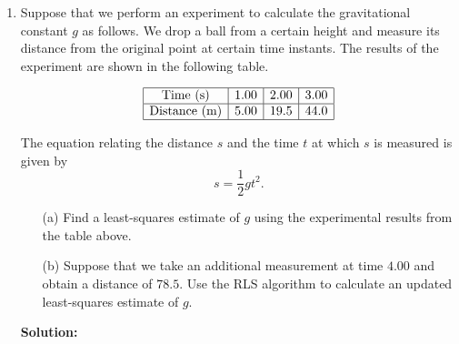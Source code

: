 \documentclass{article}
\begin{document}
\begin{enumerate}
    \item  Suppose that we perform an experiment to calculate the gravitational constant $g$ as follows. We drop a ball from a certain height and measure its distance from the original point at certain time instants. The results of the experiment are shown in the following table.

\[
\begin{array}{|c|c|c|c|}
\hline
\text{Time (s)} & 1.00 & 2.00 & 3.00 \\
\hline
\text{Distance (m)} & 5.00 & 19.5 & 44.0 \\
\hline
\end{array}
\]

The equation relating the distance $s$ and the time $t$ at which $s$ is measured is given by
\[
s = \frac{1}{2} g t^2.
\]

\begin{enumerate}
    \item[(a)] Find a least-squares estimate of $g$ using the experimental results from the table above.
    \item[(b)] Suppose that we take an additional measurement at time $4.00$ and obtain a distance of $78.5$. Use the RLS algorithm to calculate an updated least-squares estimate of $g$.
\end{enumerate}


\textbf{Solution: } 


\end{enumerate}
\end{document}
